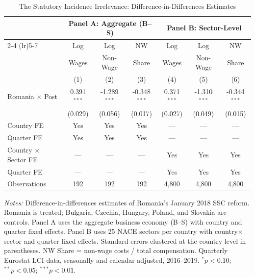 \begin{table}[htbp]
\centering
\small
\begin{threeparttable}
\caption{The Statutory Incidence Irrelevance: Difference-in-Differences Estimates}
\label{tab:did}
\begin{tabular}{lcccccc}
\toprule
 & \multicolumn{3}{c}{Panel A: Aggregate (B--S)} & \multicolumn{3}{c}{Panel B: Sector-Level} \\
\cmidrule(lr){2-4} \cmidrule(lr){5-7}
 & Log & Log & NW & Log & Log & NW \\
 & Wages & Non-Wage & Share & Wages & Non-Wage & Share \\
 & (1) & (2) & (3) & (4) & (5) & (6) \\
\midrule
Romania $\times$ Post & 0.391$^{***}$ & -1.289$^{***}$ & -0.348$^{***}$ & 0.371$^{***}$ & -1.310$^{***}$ & -0.344$^{***}$ \\
 & (0.029) & (0.056) & (0.017) & (0.027) & (0.049) & (0.015) \\
\midrule
Country FE & Yes & Yes & Yes & --- & --- & --- \\
Quarter FE & Yes & Yes & Yes & --- & --- & --- \\
Country $\times$ Sector FE & --- & --- & --- & Yes & Yes & Yes \\
Quarter FE & --- & --- & --- & Yes & Yes & Yes \\
Observations & 192 & 192 & 192 & 4,800 & 4,800 & 4,800 \\
\bottomrule
\end{tabular}
\begin{tablenotes}[flushleft]\footnotesize
\item \textit{Notes:} Difference-in-differences estimates of Romania's January 2018 SSC reform. Romania is treated; Bulgaria, Czechia, Hungary, Poland, and Slovakia are controls. Panel A uses the aggregate business economy (B--S) with country and quarter fixed effects. Panel B uses 25 NACE sectors per country with country$\times$sector and quarter fixed effects. Standard errors clustered at the country level in parentheses. NW Share = non-wage costs / total compensation. Quarterly Eurostat LCI data, seasonally and calendar adjusted, 2016--2019. $^{*}p<0.10$; $^{**}p<0.05$; $^{***}p<0.01$.
\end{tablenotes}
\end{threeparttable}
\end{table}
